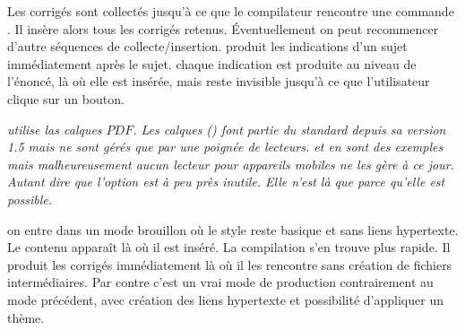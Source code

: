 \documentclass[11pt,report,oneside,solution]{cpgedev}
\let\CMD\cmd
\renewcommand\cmd[1]{{\spotcolor\CMD{#1}}}
\let\OPT\opt
\renewcommand\opt[1]{{\spotcolor\OPT{#1}}}
\begin{document}
\xopt[solution*]
     Les corrigés sont collectés jusqu'à ce que le compilateur rencontre une commande . Il insère alors tous les corrigés retenus. Éventuellement on peut recommencer d'autre séquences de collecte/insertion.  
\xopt[hint]
     produit les indications d'un sujet immédiatement après le sujet. 
\xopt[hint*]
       chaque indication est produite au niveau de l'énoncé, là où elle est insérée, mais reste invisible jusqu'à ce que l'utilisateur clique sur un bouton.
      \begin{nb}\slshape
          {} utilise las calques $PDF$. Les calques  () font partie du standard  depuis sa version {1.5} mais ne sont gérés que par une poignée de  lecteurs.  et  en sont des exemples mais malheureusement aucun lecteur  pour appareils mobiles ne les gère à ce jour. Autant dire que l'option  est à peu près inutile. Elle n'est là que parce qu'elle est possible.
      \end{nb}
\xopt[draft] 
     on entre dans un mode brouillon où le style reste basique et sans liens hypertexte. Le contenu apparaît là où il est inséré. La compilation s'en trouve plus rapide. 
\xopt[straight]
      Il produit les corrigés immédiatement là où il les rencontre sans création de fichiers intermédiaires. Par contre c'est un vrai mode de production contrairement au mode précédent, avec création des liens hypertexte et possibilité d'appliquer un thème. 
\exit 
\end{document}
